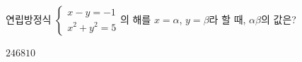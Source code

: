 연립방정식 $\begin{cases} x-y=-1 \\ x^2+y^2=5 \end{cases}$의 해를 $x=\alpha$, $y=\beta$라 할 때, $\alpha\beta$의 값은?
\begin{choices32}{$2$}{$4$}{$6$}{$8$}{$10$}\end{choices32}
